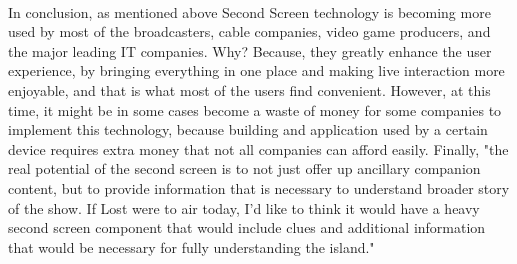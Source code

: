 \documentclass[12pt, oneside]{article}   	%
\begin{document}
   \paragraph{}
In conclusion, as mentioned above Second Screen technology is becoming more used by most of the broadcasters, cable companies, video game producers, and the major leading IT companies.  Why? Because, they greatly enhance the user experience, by bringing everything in one place and making live interaction more enjoyable, and that is what most of the users find convenient. However, at this time, it might be in some cases become a waste of money for some companies to implement this technology, because building and application used by a certain device requires extra money that not all companies can afford easily.  Finally, "the real potential of the second screen is to not just offer up ancillary companion content, but to provide information that is necessary to understand broader story of the show. If Lost were to air today, I'd like to think it would have a heavy second screen component that would include clues and additional information that would be necessary for fully understanding the island."\cite{Second-Screen-His}
 
 

 
 
\end{document}
